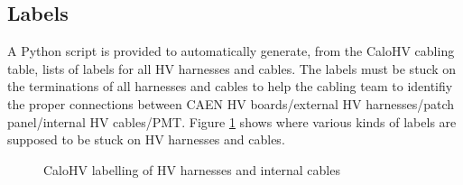 \subsection{Labels}

A  Python  script is  provided  to  automatically generate,  from  the
CaloHV cabling table, lists of labels for all HV harnesses and
cables.  The labels must be stuck on the terminations of all harnesses
and  cables  to  help  the   cabling  team  to  identifiy  the  proper
connections  between  CAEN HV boards/external HV harnesses/patch
panel/internal HV cables/PMT.   Figure  \ref{fig:calohv:labels:1}
shows  where various  kinds  of labels  are supposed  to  be stuck  on
HV harnesses and cables.

\begin{figure}[h!]
  \begin{center}
    \scalebox{0.75}{}
  \end{center}
  \caption{CaloHV labelling of HV harnesses and internal cables}
  \label{fig:calohv:labels:1}
\end{figure}

